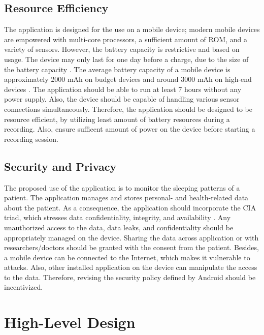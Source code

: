 

%

\subsection{Resource Efficiency}
The application is designed for the use on a mobile device; modern mobile devices are empowered with multi-core processors, a sufficient amount of ROM, and a variety of sensors. However, the battery capacity is restrictive and based on usage. The device may only last for one day before a charge, due to the size of the battery capacity \cite{androidbattery}. The average battery capacity of a mobile device is approximately 2000 mAh on budget devices and around 3000 mAh on high-end devices \cite{androidbatteryavg}. The application should be able to run at least 7 hours without any power supply. Also, the device should be capable of handling various sensor connections simultaneously. Therefore, the application should be designed to be resource efficient, by utilizing least amount of battery resources during a recording. Also, ensure sufficent amount of power on the device before starting a recording session.  

\subsection{Security and Privacy}
The proposed use of the application is to monitor the sleeping patterns of a patient. The application manages and stores personal- and health-related data about the patient. As a consequence, the application should incorporate the CIA triad, which stresses data confidentiality, integrity, and availability \cite{cia}. Any unauthorized access to the data, data leaks, and confidentiality should be appropriately managed on the device. Sharing the data across application or with researchers/doctors should be granted with the consent from the patient.  Besides, a mobile device can be connected to the Internet, which makes it vulnerable to attacks. Also, other installed application on the device can manipulate the access to the data. Therefore, revising the security policy defined by Android \cite{androidsecurity} should be incentivized. 

\section{High-Level Design}


